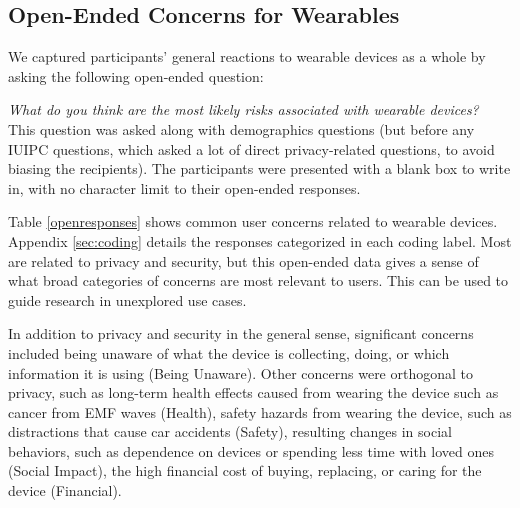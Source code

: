\subsection{Open-Ended Concerns for Wearables}
We captured participants' general reactions to wearable devices as a whole by asking the following open-ended question:

\textit{What do you think are the most likely risks associated with wearable devices?}\\[-.5cm]

This question was asked along with demographics questions (but before any IUIPC questions, which asked a lot of direct privacy-related questions, to avoid biasing the recipients). The participants were presented with a blank box to write in, with no character limit to their open-ended responses. 

Table \ref{openresponses} shows common user concerns related to wearable devices. Appendix \ref{sec:coding} details the responses categorized in each coding label. Most are related to privacy and security, but this open-ended data gives a sense of what broad categories of concerns are most relevant to users. This can be used to guide research in unexplored use cases. 

In addition to privacy and security in the general sense, significant concerns included being unaware of what the device is collecting, doing, or which information it is using (Being Unaware). Other concerns were orthogonal to privacy, such as long-term health effects caused from wearing the device such as cancer from EMF waves (Health), safety hazards from wearing the device, such as distractions that cause car accidents (Safety), resulting changes in social behaviors, such as dependence on devices or spending less time with loved ones (Social Impact), the high financial cost of buying, replacing, or caring for the device (Financial).

